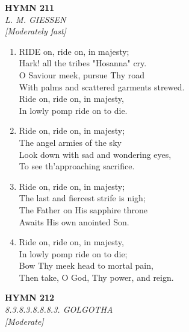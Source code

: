 \newpage
\begin{center}
    {\Large \textbf{HYMN 211}}
    \\
    \textit{L. M. GIESSEN}
    \\
    \textit{\small [Moderately fast]}
\end{center}
\vspace{1em}

\begin{enumerate}
    \item RIDE on, ride on, in majesty; \\
        Hark! all the tribes "Hosanna" cry. \\
        O Saviour meek, pursue Thy road \\
        With palms and scattered garments strewed. \\
            Ride on, ride on, in majesty, \\
            In lowly pomp ride on to die.

    \item Ride on, ride on, in majesty; \\
        The angel armies of the sky \\
        Look down with sad and wondering eyes, \\
        To see th'approaching sacrifice.

    \item Ride on, ride on, in majesty; \\
        The last and fiercest strife is nigh; \\
        The Father on His sapphire throne \\
        Awaits His own anointed Son.

    \item Ride on, ride on, in majesty, \\
        In lowly pomp ride on to die; \\
        Bow Thy meek head to mortal pain, \\
        Then take, O God, Thy power, and reign.

\end{enumerate}

\newpage
\begin{center}
    {\Large \textbf{HYMN 212}}
    \\
    \textit{8.3.8.3.8.8.8.3. GOLGOTHA}
    \\
    \textit{\small [Moderate]}
\end{center}
\vspace{1em}

